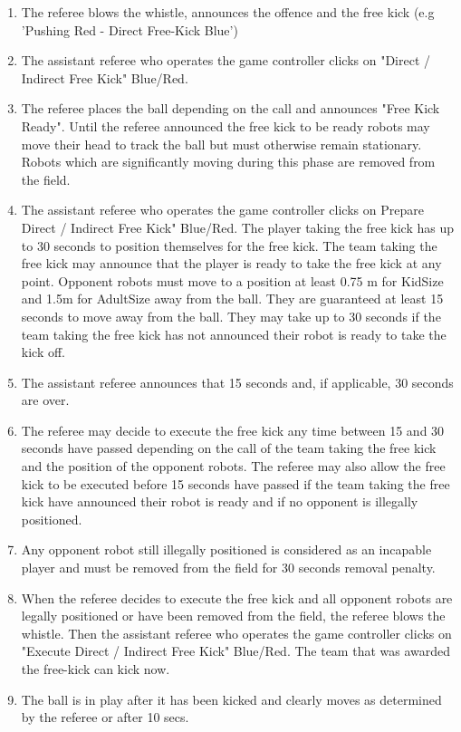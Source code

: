 \begin{enumerate}
\item The referee blows the whistle, announces the offence and the free kick
      (e.g 'Pushing Red - Direct Free-Kick Blue')
\item The assistant referee who operates the game controller clicks on "Direct / Indirect Free Kick" Blue/Red.
\item The referee places the ball depending on the call and announces "Free Kick Ready".
      Until the referee announced the free kick to be ready robots may move
      their head to track the ball but must otherwise remain stationary.
      Robots which are significantly moving during this phase are removed from the field.
\item The assistant referee who operates the game controller clicks on
      Prepare Direct / Indirect Free Kick" Blue/Red.
      The player taking the free kick has up to 30 seconds to position
      themselves for the free kick.
      The team taking the free kick may announce that the player is ready to
      take the free kick at any point.
      Opponent robots must move to a position at least 0.75 m for KidSize and
       1.5m for AdultSize away from the ball.
      They are guaranteed at least 15 seconds to move away from the ball.
      They may take up to 30 seconds if the team taking the free kick has not
      announced their robot is ready to take the kick off.
\item The assistant referee announces that 15 seconds and, if applicable, 30 seconds are over.
\item The referee may decide to execute the free kick any time between 15 and 30 seconds
      have passed depending on the call of the team taking the free kick and the position of
      the opponent robots.
      The referee may also allow the free kick to be executed before 15 seconds have passed
      if the team taking the free kick have announced their robot is ready and if no opponent is
      illegally positioned.
\item Any opponent robot still illegally positioned is considered as an
      incapable player and must be removed from the field for 30 seconds
      removal penalty.
\item When the referee decides to execute the free kick and all opponent robots are
      legally positioned or have been removed from the field,
      the referee blows the whistle.
      Then the assistant referee who operates the game controller clicks on
      "Execute Direct / Indirect Free Kick" Blue/Red.
      The team that was awarded the free-kick can kick now.
\item The ball is in play after it has been
      kicked and clearly moves as determined by the referee or after 10 secs.
\end{enumerate}

